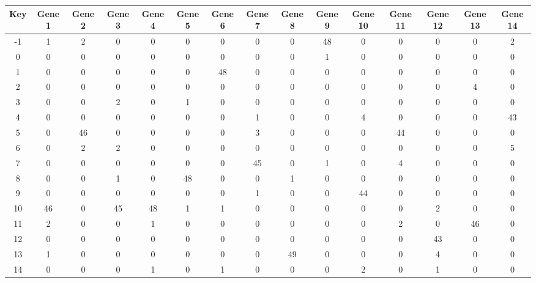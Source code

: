 \begin{tabular}{|c|c|c|c|c|c|c|c|c|c|c|c|c|c|c|}
\hline
Key & Gene 1 & Gene 2 & Gene 3 & Gene 4 & Gene 5 & Gene 6 & Gene 7 & Gene 8 & Gene 9 & Gene 10 & Gene 11 & Gene 12 & Gene 13 & Gene 14 \\
\hline
-1 & 1 & 2 & 0 & 0 & 0 & 0 & 0 & 0 & 48 & 0 & 0 & 0 & 0 & 2 \\
0 & 0 & 0 & 0 & 0 & 0 & 0 & 0 & 0 & 1 & 0 & 0 & 0 & 0 & 0 \\
1 & 0 & 0 & 0 & 0 & 0 & 48 & 0 & 0 & 0 & 0 & 0 & 0 & 0 & 0 \\
2 & 0 & 0 & 0 & 0 & 0 & 0 & 0 & 0 & 0 & 0 & 0 & 0 & 4 & 0 \\
3 & 0 & 0 & 2 & 0 & 1 & 0 & 0 & 0 & 0 & 0 & 0 & 0 & 0 & 0 \\
4 & 0 & 0 & 0 & 0 & 0 & 0 & 1 & 0 & 0 & 4 & 0 & 0 & 0 & 43 \\
5 & 0 & 46 & 0 & 0 & 0 & 0 & 3 & 0 & 0 & 0 & 44 & 0 & 0 & 0 \\
6 & 0 & 2 & 2 & 0 & 0 & 0 & 0 & 0 & 0 & 0 & 0 & 0 & 0 & 5 \\
7 & 0 & 0 & 0 & 0 & 0 & 0 & 45 & 0 & 1 & 0 & 4 & 0 & 0 & 0 \\
8 & 0 & 0 & 1 & 0 & 48 & 0 & 0 & 1 & 0 & 0 & 0 & 0 & 0 & 0 \\
9 & 0 & 0 & 0 & 0 & 0 & 0 & 1 & 0 & 0 & 44 & 0 & 0 & 0 & 0 \\
10 & 46 & 0 & 45 & 48 & 1 & 1 & 0 & 0 & 0 & 0 & 0 & 2 & 0 & 0 \\
11 & 2 & 0 & 0 & 1 & 0 & 0 & 0 & 0 & 0 & 0 & 2 & 0 & 46 & 0 \\
12 & 0 & 0 & 0 & 0 & 0 & 0 & 0 & 0 & 0 & 0 & 0 & 43 & 0 & 0 \\
13 & 1 & 0 & 0 & 0 & 0 & 0 & 0 & 49 & 0 & 0 & 0 & 4 & 0 & 0 \\
14 & 0 & 0 & 0 & 1 & 0 & 1 & 0 & 0 & 0 & 2 & 0 & 1 & 0 & 0 \\
\hline
\end{tabular}